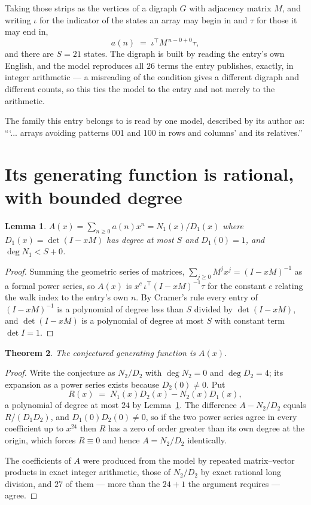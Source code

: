\documentclass[11pt,a4paper]{article}
\theoremstyle{plain}
\newtheorem{theorem}{Theorem}
\newtheorem{lemma}[theorem]{Lemma}
\theoremstyle{definition}
\begin{document}
Taking those strips as the vertices of a digraph $G$ with adjacency matrix $M$, and writing
$\iota$ for the indicator of the states an array may begin in and $\tau$ for those it may end
in,
\[
a(n)\;=\;\iota^{\!\top}M^{\,n-0+0}\tau ,
\]
and there are $S=21$ states. The digraph is built by reading the entry's own English, and the
model reproduces all $26$ terms the entry publishes, exactly, in integer arithmetic --- a
misreading of the condition gives a different digraph and different counts, so this ties the
model to the entry and not merely to the arithmetic.

The family this entry belongs to is read by one model, described by its author as: ```... arrays avoiding patterns 001 and 100 in rows and columns' and its relatives.''


\section{Its generating function is rational, with bounded degree}

\begin{lemma}\label{lem:rat}
$A(x)=\sum_{n\ge0}a(n)x^n=N_1(x)/D_1(x)$ where $D_1(x)=\det(I-xM)$ has degree at most
$S$ and $D_1(0)=1$, and $\deg N_1<S+0$.
\end{lemma}

\begin{proof}
Summing the geometric series of matrices, $\sum_{j\ge0}M^jx^j=(I-xM)^{-1}$ as a formal
power series, so $A(x)$ is $x^{c}\,\iota^{\!\top}(I-xM)^{-1}\tau$ for the constant $c$
relating the walk index to the entry's own $n$. By Cramer's rule every entry of
$(I-xM)^{-1}$ is a polynomial of degree less than $S$ divided by $\det(I-xM)$, and
$\det(I-xM)$ is a polynomial of degree at most $S$ with constant term $\det I=1$.
\end{proof}

\begin{theorem}
The conjectured generating function is $A(x)$.
\end{theorem}

\begin{proof}
Write the conjecture as $N_2/D_2$ with $\deg N_2=0$ and $\deg D_2=4$; its expansion as a
power series exists because $D_2(0)\neq0$. Put
\[
R(x)\;=\;N_1(x)D_2(x)-N_2(x)D_1(x),
\]
a polynomial of degree at most $24$ by Lemma~\ref{lem:rat}. The difference
$A-N_2/D_2$ equals $R/(D_1D_2)$, and $D_1(0)D_2(0)\neq0$, so if the two power series agree in
every coefficient up to $x^{24}$ then $R$ has a zero of order greater than its own
degree at the origin, which forces $R\equiv0$ and hence $A=N_2/D_2$ identically.

The coefficients of $A$ were produced from the model by repeated matrix--vector products in
exact integer arithmetic, those of $N_2/D_2$ by exact rational long division, and $27$
of them --- more than the $24+1$ the argument requires --- agree.
\end{proof}
\end{document}
